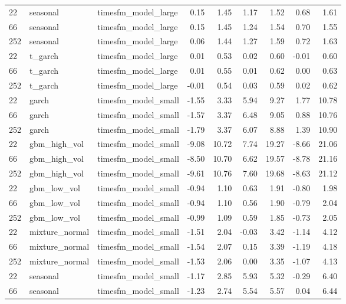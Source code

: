 {\begin{tabular}{lllrrrrrr}
\midrule
22 & seasonal & timesfm\_model\_large & 0.15 & 1.45 & 1.17 & 1.52 & 0.68 & 1.61 \\
66 & seasonal & timesfm\_model\_large & 0.15 & 1.45 & 1.24 & 1.54 & 0.70 & 1.55 \\
252 & seasonal & timesfm\_model\_large & 0.06 & 1.44 & 1.27 & 1.59 & 0.72 & 1.63 \\
\midrule
22 & t\_garch & timesfm\_model\_large & 0.01 & 0.53 & 0.02 & 0.60 & -0.01 & 0.60 \\
66 & t\_garch & timesfm\_model\_large & 0.01 & 0.55 & 0.01 & 0.62 & 0.00 & 0.63 \\
252 & t\_garch & timesfm\_model\_large & -0.01 & 0.54 & 0.03 & 0.59 & 0.02 & 0.62 \\
\midrule
22 & garch & timesfm\_model\_small & -1.55 & 3.33 & 5.94 & 9.27 & 1.77 & 10.78 \\
66 & garch & timesfm\_model\_small & -1.57 & 3.37 & 6.48 & 9.05 & 0.88 & 10.76 \\
252 & garch & timesfm\_model\_small & -1.79 & 3.37 & 6.07 & 8.88 & 1.39 & 10.90 \\
\midrule
22 & gbm\_high\_vol & timesfm\_model\_small & -9.08 & 10.72 & 7.74 & 19.27 & -8.66 & 21.06 \\
66 & gbm\_high\_vol & timesfm\_model\_small & -8.50 & 10.70 & 6.62 & 19.57 & -8.78 & 21.16 \\
252 & gbm\_high\_vol & timesfm\_model\_small & -9.61 & 10.76 & 7.60 & 19.68 & -8.63 & 21.12 \\
\midrule
22 & gbm\_low\_vol & timesfm\_model\_small & -0.94 & 1.10 & 0.63 & 1.91 & -0.80 & 1.98 \\
66 & gbm\_low\_vol & timesfm\_model\_small & -0.94 & 1.10 & 0.56 & 1.90 & -0.79 & 2.04 \\
252 & gbm\_low\_vol & timesfm\_model\_small & -0.99 & 1.09 & 0.59 & 1.85 & -0.73 & 2.05 \\
\midrule
22 & mixture\_normal & timesfm\_model\_small & -1.51 & 2.04 & -0.03 & 3.42 & -1.14 & 4.12 \\
66 & mixture\_normal & timesfm\_model\_small & -1.54 & 2.07 & 0.15 & 3.39 & -1.19 & 4.18 \\
252 & mixture\_normal & timesfm\_model\_small & -1.53 & 2.06 & 0.00 & 3.35 & -1.07 & 4.13 \\
\midrule
22 & seasonal & timesfm\_model\_small & -1.17 & 2.85 & 5.93 & 5.32 & -0.29 & 6.40 \\
66 & seasonal & timesfm\_model\_small & -1.23 & 2.74 & 5.54 & 5.57 & 0.04 & 6.44 \\

\end{tabular}}
